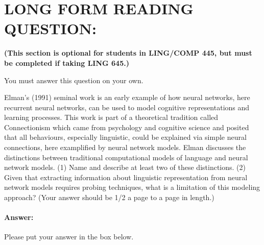 \documentclass[10pt]{article}
\begin{document}
\newpage
\section*{LONG FORM READING QUESTION:} 
\textbf{(This section is optional for students in LING/COMP 445, but must be completed if taking LING 645.)}

You must answer this question on your own.

Elman's (1991) seminal work is an early example of how neural networks, here recurrent neural networks, can be used to model cognitive representations and learning processes. This work is part of a theoretical tradition called Connectionism which came from psychology and cognitive science and posited that all behaviours, especially linguistic, could be explained via simple neural connections, here examplified by neural network models. Elman discusses the distinctions between traditional computational models of language and neural network models. (1) Name and describe at least two of these distinctions. (2) Given that extracting information about linguistic representation from neural network models requires probing techniques, what is a limitation of this modeling approach? (Your answer should be 1/2 a page to a page in length.)


\paragraph{Answer:} Please put your answer in the box below.
\end{document}
